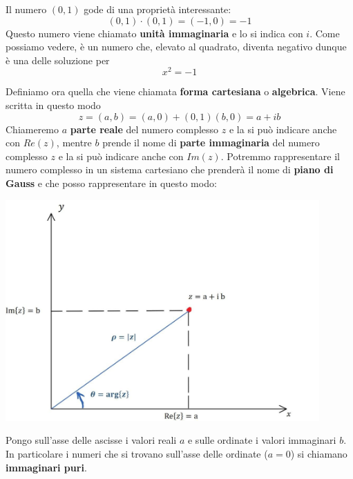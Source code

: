 Il numero $(0, 1)$ gode di una propriet\`a interessante:
\begin{equation*}
	(0, 1) \cdot (0, 1) = (-1, 0) = -1
\end{equation*}
Questo numero viene chiamato \textbf{unit\`a immaginaria} e lo si indica con $i$. Come possiamo
vedere, \`e un numero che, elevato al quadrato, diventa negativo dunque \`e una delle soluzione
per
\begin{equation*}
	x^2 = -1
\end{equation*}

\begin{definition}
	Definiamo ora quella che viene chiamata \textbf{forma cartesiana} o \textbf{algebrica}.
	Viene scritta in questo modo
	\begin{equation*}
		z = (a, b) = (a, 0) + (0, 1)(b, 0) = a + ib
	\end{equation*}
	Chiameremo $a$ \textbf{parte reale} del numero complesso $z$ e la si pu\`o indicare anche con
	$Re(z)$, mentre $b$ prende il nome di \textbf{parte immaginaria} del numero complesso $z$ e la
	si pu\`o indicare anche con $Im(z)$.
	Potremmo rappresentare il numero complesso in un sistema cartesiano che prender\`a il nome di
	\textbf{piano di Gauss} e che posso rappresentare in questo modo:

	\includegraphics[width=0.9\textwidth]{immagini/Gauss}

	Pongo sull'asse delle ascisse i valori reali $a$ e sulle ordinate i valori immaginari $b$.
	In particolare i numeri che si trovano sull'asse delle ordinate ($a = 0$) si chiamano
	\textbf{immaginari puri}.
\end{definition}

